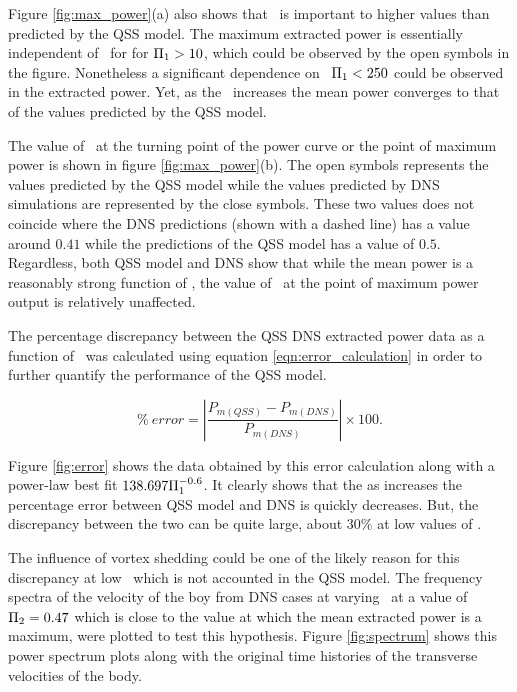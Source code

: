 

Figure \ref{fig:max_power}(a) also shows that \massstiff\ is important to higher values than predicted by the QSS model. The maximum extracted power is essentially independent of \massstiff\ for for $\Pi_1>10$, which could be observed by the open symbols in the figure. Nonetheless a significant dependence on \massstiff\  $\Pi_1<250$ could be observed in the extracted power. Yet, as the \massstiff\ increases the mean power converges to that of the values predicted by the QSS model.

The value of \massdamp\ at the turning point  of the power curve or the point of maximum power is shown in figure \ref{fig:max_power}(b). The open symbols represents the values predicted by the QSS model while the values predicted by DNS simulations are represented by the close symbols. These two values does not coincide where the DNS predictions (shown with a dashed line) has a value around $0.41$ while the predictions of the QSS model has a value of $0.5$. Regardless, both QSS model and DNS show that while the mean power is a reasonably strong function of \massstiff, the value of \massdamp\ at the point of maximum power output is relatively unaffected.


The percentage discrepancy between the QSS DNS  extracted power data as a function of \massstiff\ was calculated using equation \ref{eqn:error_calculation} in order to further quantify the performance of the QSS model.  
 
\begin{equation}   \label{eqn:error_calculation} 
\% \ error=\left|{\frac{P_{m(QSS)} - P_{m(DNS)}}{P_{m(DNS)}}}\right| \times 100.
\end{equation}

Figure \ref{fig:error} shows the data obtained by this error calculation along with a power-law best fit $138.697\Pi_1^{-0.6}$. It clearly shows that the as \massstiff increases the percentage error between QSS model and DNS is quickly decreases. But, the discrepancy between the two can be quite large, about $30\%$ at low values of \massstiff.



The influence of vortex shedding could be one of the likely reason for this discrepancy at low \massstiff\ which is not accounted in the QSS model. The frequency spectra of the velocity of the boy from DNS cases at varying \massstiff\  at a value of $\Pi_2=0.47$ which is close to the value at which the mean extracted power is a maximum, were plotted to test this hypothesis. Figure \ref{fig:spectrum} shows this power spectrum plots along with the original time histories of the transverse velocities of the body. 

